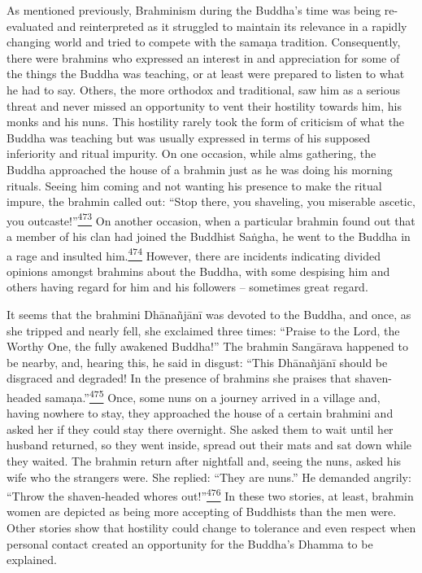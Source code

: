 As mentioned previously, Brahminism during the Buddha's time was being
re-evaluated and reinterpreted as it struggled to maintain its relevance
in a rapidly changing world and tried to compete with the samaṇa
tradition. Consequently, there were brahmins who expressed an interest
in and appreciation for some of the things the Buddha was teaching, or
at least were prepared to listen to what he had to say. Others, the more
orthodox and traditional, saw him as a serious threat and never missed
an opportunity to vent their hostility towards him, his monks and his
nuns. This hostility rarely took the form of criticism of what the
Buddha was teaching but was usually expressed in terms of his supposed
inferiority and ritual impurity. On one occasion, while alms gathering,
the Buddha approached the house of a brahmin just as he was doing his
morning rituals. Seeing him coming and not wanting his presence to make
the ritual impure, the brahmin called out: ``Stop there, you shaveling,
you miserable ascetic, you
outcaste!''\label{footprints_split_013.html_fnref473}\hyperref[footprints_split_025.htmlux5cux23fn473]{\textsuperscript{473}}
On another occasion, when a particular brahmin found out that a member
of his clan had joined the Buddhist Saṅgha, he went to the Buddha in a
rage and insulted
him.\label{footprints_split_013.html_fnref474}\hyperref[footprints_split_025.htmlux5cux23fn474]{\textsuperscript{474}}
However, there are incidents indicating divided opinions amongst
brahmins about the Buddha, with some despising him and others having
regard for him and his followers -- sometimes great regard.

It seems that the brahmini Dhānañjānī was devoted to the Buddha, and
once, as she tripped and nearly fell, she exclaimed three times:
``Praise to the Lord, the Worthy One, the fully awakened Buddha!'' The
brahmin Sangārava happened to be nearby, and, hearing this, he said in
disgust: ``This Dhānañjānī should be disgraced and degraded! In the
presence of brahmins she praises that shaven-headed
samaṇa.''\label{footprints_split_013.html_fnref475}\hyperref[footprints_split_025.htmlux5cux23fn475]{\textsuperscript{475}}
Once, some nuns on a journey arrived in a village and, having nowhere to
stay, they approached the house of a certain brahmini and asked her if
they could stay there overnight. She asked them to wait until her
husband returned, so they went inside, spread out their mats and sat
down while they waited. The brahmin return after nightfall and, seeing
the nuns, asked his wife who the strangers were. She replied: ``They are
nuns.'' He demanded angrily: ``Throw the shaven-headed whores
out!''\label{footprints_split_013.html_fnref476}\hyperref[footprints_split_025.htmlux5cux23fn476]{\textsuperscript{476}}
In these two stories, at least, brahmin women are depicted as being more
accepting of Buddhists than the men were. Other stories show that
hostility could change to tolerance and even respect when personal
contact created an opportunity for the Buddha's Dhamma to be explained.


